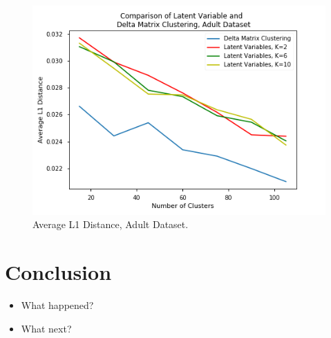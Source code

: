 \documentclass{article}
\begin{document}
\begin{figure}
  \centering
  \includegraphics[width= \columnwidth]{adult}
  \caption{\label{fig:adult} Average L1 Distance, Adult Dataset.}
\end{figure}

\section{Conclusion}

\begin{itemize}
\item What happened?
\item What next?
\end{itemize}

\lipsum[4-6]







\end{document}
